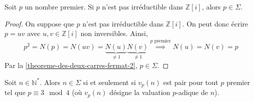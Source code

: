   \begin{lemma}
    \label{theoreme-des-deux-carres-fermat-4}
    Soit $p$ un nombre premier. Si $p$ n'est pas irréductible dans $\mathbb{Z}[i]$, alors $p \in \Sigma$.
  \end{lemma}

  \begin{proof}
    On suppose que $p$ n'est pas irréductible dans $\mathbb{Z}[i]$. On peut donc écrire $p = uv$ avec $u, v \in \mathbb{Z}[i]$ non inversibles. Ainsi,
    \[ p^2 = N(p) = N(uv) = \underbrace{N(u)}_{\neq 1} \underbrace{N(v)}_{\neq 1} \overset{p \text{ premier}}{\implies} N(u) = N(v) = p \]
    Par la \cref{theoreme-des-deux-carres-fermat-2}, $p \in \Sigma$.
  \end{proof}

  \begin{theorem}
    Soit $n \in \mathbb{N}^*$. Alors $n \in \Sigma$ si et seulement si $v_p(n)$ est pair pour tout $p$ premier tel que $p \equiv 3 \mod 4$ (où $v_p(n)$ désigne la valuation $p$-adique de $n$).
  \end{theorem}


